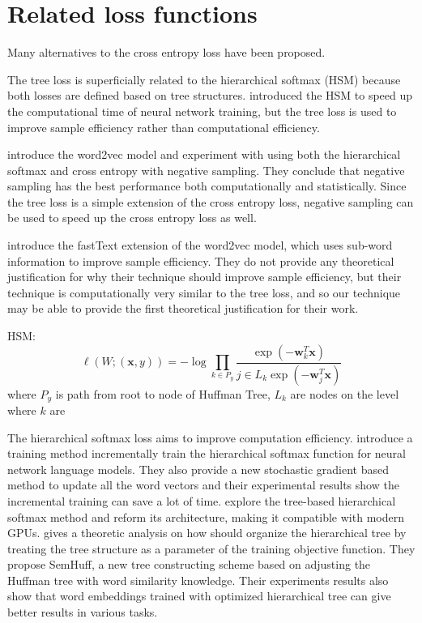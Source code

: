 \documentclass[twoside]{article}
\newcommand{\trans}[1]{{#1}^{T}}
\newcommand{\w}{\mathbf w}
\newcommand{\x}{\mathbf x}
\begin{document}

\appendix
\section{Related loss functions}

Many alternatives to the cross entropy loss have been proposed.

The tree loss is superficially related to the hierarchical softmax (HSM) because both losses are defined based on tree structures.
\cite{morin2005hierarchical} introduced the HSM to speed up the computational time of neural network training,
but the tree loss is used to improve sample efficiency rather than computational efficiency.

\cite{mikolov2013distributed} introduce the word2vec model and experiment with using both the hierarchical softmax and cross entropy with negative sampling.
They conclude that negative sampling has the best performance both computationally and statistically.
Since the tree loss is a simple extension of the cross entropy loss,
negative sampling can be used to speed up the cross entropy loss as well.

\cite{bojanowski2017enriching} introduce the fastText extension of the word2vec model, which uses sub-word information to improve sample efficiency.
They do not provide any theoretical justification for why their technique should improve sample efficiency,
but their technique is computationally very similar to the tree loss,
and so our technique may be able to provide the first theoretical justification for their work.

HSM:
\begin{equation}
    \label{eq:xentropy}
    \ell(W;(\x,y)) = - \log \prod_{k\in P_y}\frac {\exp(-\trans\w_k \x)}{j\in L_k \exp(-\trans \w_j \x)}
\end{equation}
where $P_y$ is path from root to node of Huffman Tree,
$L_k$ are nodes on the level where $k$ are


The hierarchical softmax loss aims to improve computation efficiency. 
\cite{Peng2017IncrementallyLT} introduce a training method incrementally train the hierarchical softmax function for neural network language models.
They also provide a new stochastic gradient based method to update all the word vectors and their experimental results show the incremental training can save a lot of time.
\cite{Jiang2017ExplorationOT} explore the tree-based hierarchical softmax method and reform its architecture, making it compatible with modern GPUs.
\cite{Yang2017OptimizeHS} gives a theoretic analysis on how should organize the hierarchical tree by treating the tree structure as a parameter of the training objective function.
They propose SemHuff, a new tree constructing scheme based on adjusting the Huffman tree with word similarity knowledge.
Their experiments results also show that word embeddings trained with optimized hierarchical tree can give better results in various tasks.
\end{document}

